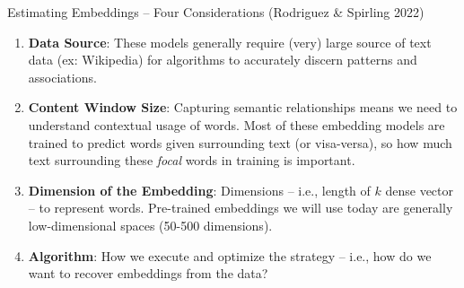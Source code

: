 \documentclass[
  ignorenonframetext,
  aspectratio=169]{beamer}
\begin{document}
\begin{frame}{Estimating Embeddings -- Four Considerations (Rodriguez \&
Spirling 2022)}
\label{estimating-embeddings-four-considerations-rodriguez-spirling-2022}
\begin{enumerate}
\item \textbf{Data Source}: These models generally require (very) large source of text data (ex: Wikipedia) for algorithms to accurately discern patterns and associations.
\par \vspace{2.5mm} \pause

\item \textbf{Content Window Size}: Capturing semantic relationships means we need to understand contextual usage of words. Most of these embedding models are trained to predict words given surrounding text (or visa-versa), so how much text surrounding these \emph{focal} words in training is important. 
\par \vspace{2.5mm} \pause

\item \textbf{Dimension of the Embedding}: Dimensions -- i.e., length of $k$ dense vector -- to represent words. Pre-trained embeddings we will use today are generally low-dimensional spaces (50-500 dimensions). 
\par \vspace{2.5mm} \pause

\item \textbf{Algorithm}: How we execute and optimize the strategy -- i.e., how do we want to recover embeddings from the data? 
\end{enumerate}
\end{frame}
\end{document}
